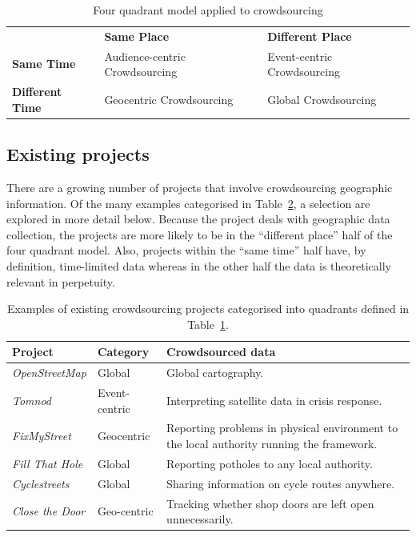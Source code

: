 \documentclass{article}
\begin{document}
		\begin{table}[ht]
			\begin{tabularx}{\textwidth}{ | l || X | X | }
				\hline
				                        & \textbf{Same Place}            & \textbf{Different Place} \\ \hhline{|=#=|=|}
				\textbf{Same Time}      & Audience-centric Crowdsourcing & Event-centric Crowdsourcing \\ \hline
				\textbf{Different Time} & Geocentric Crowdsourcing       & Global Crowdsourcing \\ \hline
			\end{tabularx}
			\caption{Four quadrant model applied to crowdsourcing\cite{erickson_geocentric_2010}}
			\label{tab:quad}
		\end{table}

		\subsection{Existing projects}
		There are a growing number of projects that involve crowdsourcing geographic information. Of the many examples categorised in Table~\ref{tab:existing-projects}, a selection are explored in more detail below. Because the project deals with geographic data collection, the projects are more likely to be in the ``different place'' half of the four quadrant model. Also, projects within the ``same time'' half have, by definition, time-limited data whereas in the other half the data is theoretically relevant in perpetuity.

		\begin{table}[ht]
			\begin{tabularx}{\textwidth}{ | l | l | X |}
				\hline
				\textbf{Project} & \textbf{Category} & \textbf{Crowdsourced data} \\ \hline
				\emph{OpenStreetMap}\cite{_openstreetmap_????} & Global & Global cartography. \\ \hline
				\emph{Tomnod}\cite{_missing_2014} & Event-centric & Interpreting satellite data in crisis response. \\ \hline
				\emph{FixMyStreet}\cite{_mysociety/fixmystreet_2015} & Geocentric & Reporting problems in physical environment to the local authority running the framework. \\ \hline
				\emph{Fill That Hole}\cite{_fill_????} & Global & Reporting potholes to any local authority. \\ \hline
				\emph{Cyclestreets}\cite{_cyclestreets_????} & Global & Sharing information on cycle routes anywhere. \\ \hline
				\emph{Close the Door}\cite{massung_using_2013}\cite{preist_competing_2014} & Geo-centric & Tracking whether shop doors are left open unnecessarily. \\ \hline
			\end{tabularx}
			\caption{Examples of existing crowdsourcing projects categorised into quadrants defined in Table~\ref{tab:quad}.}
			\label{tab:existing-projects}
		\end{table}
\end{document}
